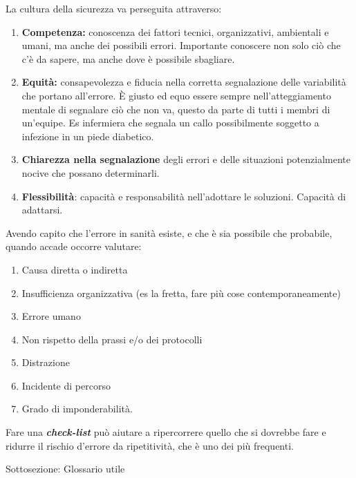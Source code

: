 \documentclass[]{article}
\begin{document}
La cultura della sicurezza va perseguita attraverso:

\begin{enumerate}
\def\labelenumi{\arabic{enumi}.}
\item
  \textbf{Competenza:} conoscenza dei fattori tecnici, organizzativi,
  ambientali e umani, ma anche dei possibili errori. Importante
  conoscere non solo ciò che c'è da sapere, ma anche dove è possibile
  sbagliare.
\item
  \textbf{Equità:} consapevolezza e fiducia nella corretta segnalazione
  delle variabilità che portano all'errore. È giusto ed equo essere
  sempre nell'atteggiamento mentale di segnalare ciò che non va, questo
  da parte di tutti i membri di un'equipe. Es infermiera che segnala un
  callo possibilmente soggetto a infezione in un piede diabetico.
\item
  \textbf{Chiarezza nella segnalazione} degli errori e delle situazioni
  potenzialmente nocive che possano determinarli.
\item
  \textbf{Flessibilità}: capacità e responsabilità nell'adottare le
  soluzioni. Capacità di adattarsi.
\end{enumerate}

Avendo capito che l'errore in sanità esiste, e che è sia possibile che
probabile, quando accade occorre valutare:

\begin{enumerate}
\def\labelenumi{\arabic{enumi}.}
\item
  Causa diretta o indiretta
\item
  Insufficienza organizzativa (es la fretta, fare più cose
  contemporaneamente)
\item
  Errore umano
\item
  Non rispetto della prassi e/o dei protocolli
\item
  Distrazione
\item
  Incidente di percorso
\item
  Grado di imponderabilità.
\end{enumerate}

Fare una \emph{\textbf{check-list}} può aiutare a ripercorrere quello
che si dovrebbe fare e ridurre il rischio d'errore da ripetitività, che
è uno dei più frequenti.

Sottosezione: Glossario utile
\end{document}
